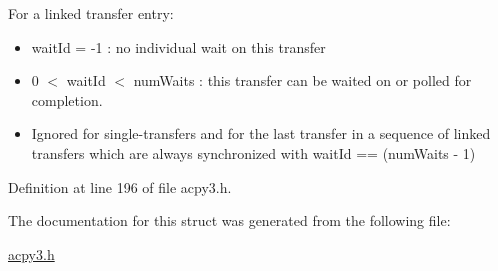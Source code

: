 For a linked transfer entry:\begin{itemize}
\item wait\-Id = -1 : no individual wait on this transfer\item 0 $<$ wait\-Id $<$ num\-Waits : this transfer can be waited on or polled for completion.\item Ignored for single-transfers and for the last transfer in a sequence of linked transfers which are always synchronized with wait\-Id == (num\-Waits - 1) \end{itemize}


Definition at line 196 of file acpy3.h.

The documentation for this struct was generated from the following file:\begin{CompactItemize}
\item 
\hyperlink{acpy3_8h}{acpy3.h}\end{CompactItemize}
